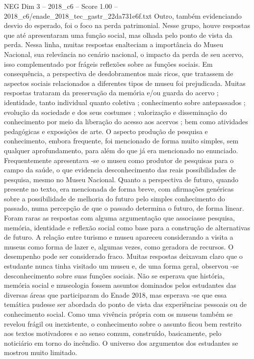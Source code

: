 \begin{textsample}{NEG Dim 3 – 2018\_c6 – Score 1.00 – 2018\_c6/enade\_2018\_tec\_gastr\_22da731e6f.txt}
Outro, também evidenciando desvio do esperado, foi o foco na perda patrimonial.
Nesse grupo, houve respostas que até apresentaram uma função social, mas olhada pelo ponto de vista da perda.
Nessa linha, muitas respostas enalteciam a importância do Museu Nacional, sua relevância no cenário nacional, o impacto da perda de seu acervo, isso complementado por frágeis reflexões sobre as funções sociais.
Em consequência, a perspectiva de desdobramentos mais ricos, que tratassem de aspectos sociais relacionados a diferentes tipos de museu foi prejudicada.
Muitas respostas trataram da preservação da memória e/ou guarda do acervo ; identidade, tanto individual quanto coletiva ; conhecimento sobre antepassados ; evolução da sociedade e dos seus costumes ; valorização e disseminação do conhecimento por meio da liberação do acesso aos acervos ; bem como atividades pedagógicas e exposições de arte.
O aspecto produção de pesquisa e conhecimento, embora frequente, foi mencionado de forma muito simples, sem qualquer aprofundamento, para além do que já era mencionado no enunciado.
Frequentemente apresentava -se o museu como produtor de pesquisas para o campo da saúde, o que evidencia desconhecimento das reais possibilidades de pesquisa, mesmo no Museu Nacional.
Quanto a perspectiva de futuro, quando presente no texto, era mencionada de forma breve, com afirmações genéricas sobre a possibilidade de melhoria do futuro pelo simples conhecimento do passado, numa percepção de que o passado determina o futuro, de forma linear.
Foram raras as respostas com alguma argumentação que associasse pesquisa, memória, identidade e reflexão social como base para a construção de alternativas de futuro.
A relação entre turismo e museu apareceu considerando a visita a museus como forma de lazer e, algumas vezes, como geradora de recursos.
O desempenho pode ser considerado fraco.
Muitas respostas deixavam claro que o estudante nunca tinha visitado um museu e, de uma forma geral, observou -se desconhecimento sobre suas funções sociais.
Não se esperava que história, memória social e museologia fossem assuntos dominados pelos estudantes das diversas áreas que participaram do Enade 2018, mas esperava -se que essa temática pudesse ser abordada do ponto de vista das experiências pessoais ou de conhecimento social.
Como uma vivência própria com os museus também se revelou frágil ou inexistente, o conhecimento sobre o assunto ficou bem restrito aos textos motivadores e ao senso comum, construído, basicamente, pelo noticiário em torno do incêndio.
O universo dos argumentos dos estudantes se mostrou muito limitado.

\end{textsample}
